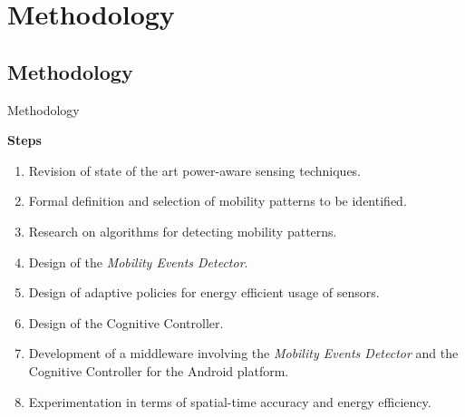 \section{Methodology}
\subsection{Methodology}
\begin{frame}{Methodology}
\small
\begin{block}{\small \textbf{Steps}}
\begin{enumerate}
  \item Revision of state of the art power-aware sensing techniques.
  \item Formal definition and selection of mobility patterns to be identified.
  \item Research on algorithms for detecting mobility patterns.
  \item Design of the \emph{Mobility Events Detector}.
  \item Design of adaptive policies for energy efficient usage of sensors.
  \item Design of the Cognitive Controller.
  \item Development of a middleware involving the \emph{Mobility Events Detector} and the Cognitive Controller for the Android platform.
  \item Experimentation in terms of spatial-time accuracy and energy efficiency.
\end{enumerate}
\end{block}
\end{frame}
